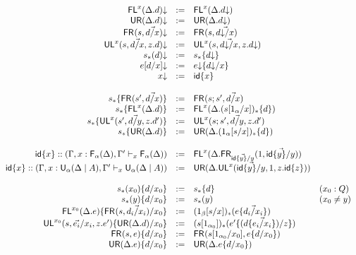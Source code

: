 \begin{figure}
\begin{small}
\[
\begin{array}{rcll}
\mathsf{FL}^{x}(\Delta.d)\mathord{\downarrow} & := & \mathsf{FL}^{x}(\Delta.d\mathord{\downarrow})\\
\mathsf{UR}(\Delta.d)\mathord{\downarrow} & := & \mathsf{UR}(\Delta.d\mathord{\downarrow})\\
\mathsf{FR}_{}(s,\vec{d/x})\mathord{\downarrow} & := & \mathsf{FR}_{}(s,\vec{d\mathord{\downarrow}/x})\\
\mathsf{UL}^{x}_{}(s,\vec{d/x},z.d)\mathord{\downarrow} & := & {\mathsf{UL}^{x}_{}(s,\vec{d\mathord{\downarrow}/x},z.d\mathord{\downarrow})}\\
s_*(d)\mathord{\downarrow} & := & s_*\{d\mathord{\downarrow}\}\\
e[d/x]\mathord{\downarrow} & := & e\mathord{\downarrow}\{d\mathord{\downarrow}/x\}\\
{x}\mathord{\downarrow} & := & {\mathsf{id}\{x\}}\\
\\
s_*\{\mathsf{FR}_{}(s',\vec{d/x})\} & := & \mathsf{FR}_{}(s;s',\vec{d/x})\\
s_*\{\mathsf{FL}^{x}(\Delta.d)\} & := & \mathsf{FL}^{x}(\Delta.(s[1_\alpha/x])_*\{d\})\\
s_*\{\mathsf{UL}^{x}_{}(s',\vec{d/y},z.d')\} & := & {\mathsf{UL}^{x}_{}(s;s',\vec{d/y},z.d')}\\
s_*\{\mathsf{UR}(\Delta.d)\} & := & \mathsf{UR}(\Delta.(1_\alpha[s/x])_*\{d\}) \\
\\
{\mathsf{id}\{x\}} :: (\Gamma,x:\mathsf{F}_{\alpha}(\Delta),\Gamma' \vdash_{x} \mathsf{F}_{\alpha}(\Delta)) & := & \mathsf{FL}^{x}(\Delta.\mathsf{FR}_{\vec{{\mathsf{id}\{y\}}/y}}(1,\vec{{\mathsf{id}\{y\}}/y}))\\
{\mathsf{id}\{x\}} :: (\Gamma,x:\mathsf{U}_{\alpha}(\Delta \mid A),\Gamma' \vdash_{x} \mathsf{U}_{\alpha}(\Delta \mid A)) & := & \mathsf{UR}(\Delta.\mathsf{UL}^{x}_{}(\vec{{\mathsf{id}\{y\}}/y},1,z.{\mathsf{id}\{z\}})) \\
\\
s_*(x_0)\{d/x_0\} & := & s_*\{d\} & (x_0 : Q)\\
s_*(y)\{d/x_0\} & := & s_*(y) & (x_0 \neq y)\\
\mathsf{FL}^{x_0}(\Delta.e)\{\mathsf{FR}_{}(s,\vec{d_i/x_i})/x_0\} & := & (1_\beta[s/x])_*(e\{\vec{d_i/x_i}\}) \\
\mathsf{UL}^{x_0}_{}(s,\vec{e_i}/x_i,z.e')\{\mathsf{UR}(\Delta.d)/x_0\} & := & (s[1_{\alpha_0}])_*(e'\{(d\{{\vec{e_i/x_i}}\})/z\}) &  \\
\mathsf{FR}_{}(s,e)\{d/x_0\} & := & {\mathsf{FR}_{}(s[1_{\alpha_0}/x_0],e\{d/x_0\})}\\
\mathsf{UR}(\Delta.e)\{d/x_0\} & := & \mathsf{UR}(\Delta.e\{d/x_0\})\\

\end{array}\]
\end{small}
\end{figure}
